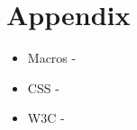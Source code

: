 \documentclass[draftclsnofoot,onecolumn,letterpaper,10pt,compsoc]{IEEEtran}
\begin{document}
\section{Appendix}

\begin{itemize}
  \item Macros -
  \item CSS -
  \item W3C -
\end{itemize}


\clearpage


{}

\end{document}
